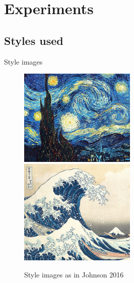 \documentclass{beamer}
\begin{document}
    \section{Experiments}

    \subsection{Styles used}

    \begin{frame}{Style images}

        \begin{figure}
            \includegraphics[width=0.495\textwidth]{starry}
            \hfill
            \includegraphics[width=0.495\textwidth]{tsunami}
            \caption{\label{fig:style_paper}Style images as in Johnson 2016}
        \end{figure}

    \end{frame}
\end{document}
